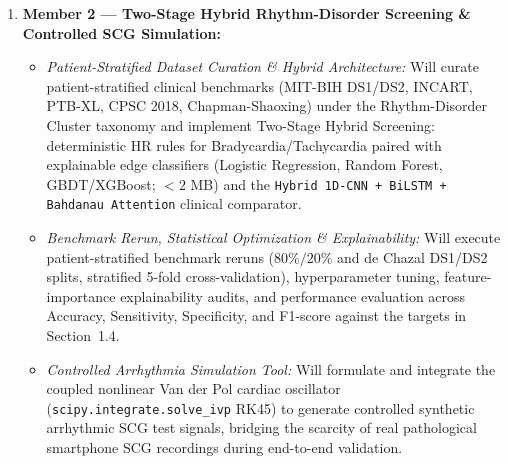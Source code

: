 \begin{enumerate}
	\item \textbf{Member 2 --- Two-Stage Hybrid Rhythm-Disorder Screening \& Controlled SCG Simulation:}
	\begin{itemize}
		\item \textit{Patient-Stratified Dataset Curation \& Hybrid Architecture:} Will curate patient-stratified clinical benchmarks (MIT-BIH DS1/DS2, INCART, PTB-XL, CPSC 2018, Chapman-Shaoxing) under the Rhythm-Disorder Cluster taxonomy and implement Two-Stage Hybrid Screening: deterministic HR rules for Bradycardia/Tachycardia paired with explainable edge classifiers (Logistic Regression, Random Forest, GBDT/XGBoost; $< 2\text{ MB}$) and the \texttt{Hybrid 1D-CNN + BiLSTM + Bahdanau Attention} clinical comparator.
		\item \textit{Benchmark Rerun, Statistical Optimization \& Explainability:} Will execute patient-stratified benchmark reruns ($80\%/20\%$ and de Chazal DS1/DS2 splits, stratified 5-fold cross-validation), hyperparameter tuning, feature-importance explainability audits, and performance evaluation across Accuracy, Sensitivity, Specificity, and F1-score against the targets in Section~1.4.
		\item \textit{Controlled Arrhythmia Simulation Tool:} Will formulate and integrate the coupled nonlinear Van der Pol cardiac oscillator (\texttt{scipy.integrate.solve\_ivp} RK45) to generate controlled synthetic arrhythmic SCG test signals, bridging the scarcity of real pathological smartphone SCG recordings during end-to-end validation.
	\end{itemize}
\end{enumerate}